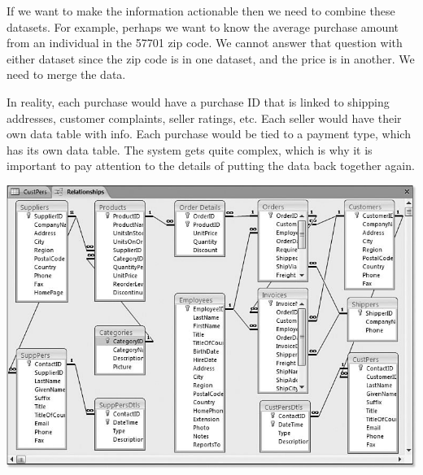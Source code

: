 \documentclass[]{book}
\newenvironment{Shaded}{\begin{snugshade}}{\end{snugshade}}
\newcommand{\CommentTok}[1]{\textcolor[rgb]{0.56,0.35,0.01}{\textit{#1}}}
\newcommand{\KeywordTok}[1]{\textcolor[rgb]{0.13,0.29,0.53}{\textbf{#1}}}
\newcommand{\NormalTok}[1]{#1}
\newcommand{\OperatorTok}[1]{\textcolor[rgb]{0.81,0.36,0.00}{\textbf{#1}}}
\newcommand{\StringTok}[1]{\textcolor[rgb]{0.31,0.60,0.02}{#1}}
\theoremstyle{definition}
\theoremstyle{definition}
\theoremstyle{definition}
\theoremstyle{remark}
\begin{document}
If we want to make the information actionable then we need to combine
these datasets. For example, perhaps we want to know the average
purchase amount from an individual in the 57701 zip code. We cannot
answer that question with either dataset since the zip code is in one
dataset, and the price is in another. We need to merge the data.

\begin{Shaded}
\end{Shaded}

In reality, each purchase would have a purchase ID that is linked to
shipping addresses, customer complaints, seller ratings, etc. Each
seller would have their own data table with info. Each purchase would be
tied to a payment type, which has its own data table. The system gets
quite complex, which is why it is important to pay attention to the
details of putting the data back together again.

\includegraphics{figures/SampleRetailDatabase.png}
\end{document}

